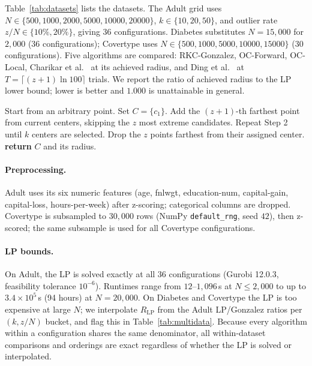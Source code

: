 \documentclass[twoside,leqno,twocolumn]{article}
\begin{document}
Table~\ref{tab:datasets} lists the datasets. The Adult grid uses
$N\in\{500,1000,2000,5000,10000,20000\}$, $k\in\{10,20,50\}$, and
outlier rate $z/N\in\{10\%,20\%\}$, giving 36 configurations.
Diabetes substitutes $N=15{,}000$ for $2{,}000$ (36 configurations);
Covertype uses $N\in\{500,1000,5000,10000,15000\}$ (30
configurations). Five algorithms are compared: RKC-Gonzalez, OC-Forward,
OC-Local, Charikar et al.\ \cite{charikar2001} at its achieved radius,
and Ding et al.\ \cite{ding2019} at $T=\lceil(z{+}1)\ln100\rceil$
trials. We report the ratio of achieved radius to the LP lower bound;
lower is better and $1.000$ is unattainable in general.

\begin{algorithm}[t]
\caption{RKC-Gonzalez$(X, k, z)$}
\label{alg:rkcgonzalez}
\begin{algorithmic}[1]
\STATE Start from an arbitrary point. Set $C = \{c_1\}$.
\STATE Add the $(z{+}1)$-th farthest point from current centers,
       skipping the $z$ most extreme candidates.
\STATE Repeat Step 2 until $k$ centers are selected.
\STATE Drop the $z$ points farthest from their assigned center.
\STATE \textbf{return} $C$ and its radius.
\end{algorithmic}
\end{algorithm}

\paragraph{Preprocessing.}
Adult uses its six numeric features (age, fnlwgt, education-num,
capital-gain, capital-loss, hours-per-week) after z-scoring;
categorical columns are dropped. Covertype is subsampled to
$30{,}000$ rows (NumPy \texttt{default\_rng}, seed $42$), then
z-scored; the same subsample is used for all Covertype configurations.

\paragraph{LP bounds.}
On Adult, the LP is solved exactly at all 36 configurations (Gurobi
12.0.3, feasibility tolerance $10^{-6}$). Runtimes range from
$12$--$1{,}096$\,s at $N\le2{,}000$ to up to $3.4\times10^{5}$\,s (94
hours) at $N=20{,}000$. On Diabetes and Covertype the LP is too
expensive at large $N$; we interpolate $R_\mathrm{LP}$ from the
Adult LP/Gonzalez ratios per $(k,z/N)$ bucket, and flag this in
Table~\ref{tab:multidata}. Because every algorithm within a
configuration shares the same denominator, all within-dataset
comparisons and orderings are exact regardless of whether the LP is
solved or interpolated.
\end{document}
